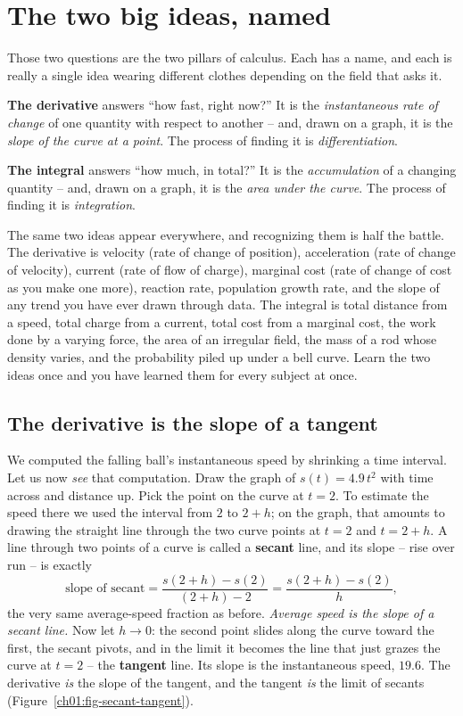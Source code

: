 \section{The two big ideas, named}

Those two questions are the two pillars of calculus. Each has a name, and each
is really a single idea wearing different clothes depending on the field that
asks it.

\begin{focusbox}
\textbf{The derivative} answers ``how fast, right now?'' It is the
\emph{instantaneous rate of change} of one quantity with respect to another --
and, drawn on a graph, it is the \emph{slope of the curve at a point}. The
process of finding it is \emph{differentiation}.

\textbf{The integral} answers ``how much, in total?'' It is the
\emph{accumulation} of a changing quantity -- and, drawn on a graph, it is the
\emph{area under the curve}. The process of finding it is \emph{integration}.
\end{focusbox}

The same two ideas appear everywhere, and recognizing them is half the battle.
The derivative is velocity (rate of change of position), acceleration (rate of
change of velocity), current (rate of flow of charge), marginal cost (rate of
change of cost as you make one more), reaction rate, population growth rate, and
the slope of any trend you have ever drawn through data. The integral is total
distance from a speed, total charge from a current, total cost from a marginal
cost, the work done by a varying force, the area of an irregular field, the mass
of a rod whose density varies, and the probability piled up under a bell curve.
Learn the two ideas once and you have learned them for every subject at once.

\subsection{The derivative is the slope of a tangent}

We computed the falling ball's instantaneous speed by shrinking a time interval.
Let us now \emph{see} that computation. Draw the graph of $s(t)=4.9\,t^2$ with
time across and distance up. Pick the point on the curve at $t = 2$. To estimate
the speed there we used the interval from $2$ to $2+h$; on the graph, that
amounts to drawing the straight line through the two curve points at $t=2$ and
$t=2+h$. A line through two points of a curve is called a \textbf{secant} line,
and its slope -- rise over run -- is exactly
\[
  \text{slope of secant} = \frac{s(2+h)-s(2)}{(2+h)-2}
  = \frac{s(2+h)-s(2)}{h},
\]
the very same average-speed fraction as before. \emph{Average speed is the slope
of a secant line.} Now let $h \to 0$: the second point slides along the curve
toward the first, the secant pivots, and in the limit it becomes the line that
just grazes the curve at $t = 2$ -- the \textbf{tangent} line. Its slope is the
instantaneous speed, $19.6$. The derivative \emph{is} the slope of the tangent,
and the tangent \emph{is} the limit of secants (Figure~\ref{ch01:fig-secant-tangent}).

